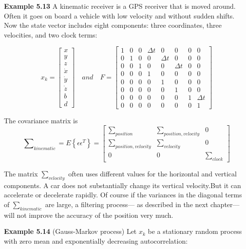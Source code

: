 	
	\textbf{Example 5.13 }A kinematic receiver is a GPS receiver that is moved around. Often it goes on board a vehicle with low velocity and without sudden shifts. Now the state vector includes eight components: three coordinates, three velocities, and two clock terms:
	
	\[ x_{k}=\begin{bmatrix}
x\\y\\z\\\dot{x}\\\dot{y}\\\dot{z}\\b\\d
\end{bmatrix}\quad and \quad  F=\begin{bmatrix}
1&0&0&\Delta t&0&0&0&0\\0&1&0&0&\Delta t&0&0&0\\0&0&1&0&0&\Delta t&0&0\\0&0&0&1&0&0&0&0\\0&0&0&0&1&0&0&0\\0&0&0&0&0&1&0&0\\0&0&0&0&0&0&1&\Delta t\\0&0&0&0&0&0&0&1
\end{bmatrix}  \]

The covariance matrix is
\begin{equation}\label{5.30}
\sum\nolimits_{kinematic}=E\left\lbrace \epsilon\epsilon^{T}   \right\rbrace=\begin{bmatrix}
\sum\nolimits_{position}&\sum\nolimits_{position,velocity}&0\\\sum\nolimits_{position,velocity}&\sum\nolimits_{velocity}&0\\0&0&\sum\nolimits_{clock}
\end{bmatrix} 
\end{equation}
 
The matrix $ \sum\nolimits_{velocity} $ often uses different values for the horizontal and vertical components. A car does not substantially change its vertical velocity.But it can accelerate or decelerate rapidly. Of course if the variances in the diagonal terms of  $ \sum\nolimits_{kinematic} $ are large, a filtering process— as described in the next chapter— will not improve the accuracy of the position very much.

 
\textbf{Example 5.14} (Gauss-Markov process) Let $ x_{k} $ be a stationary random process with zero mean and exponentially decreasing autocorrelation:

